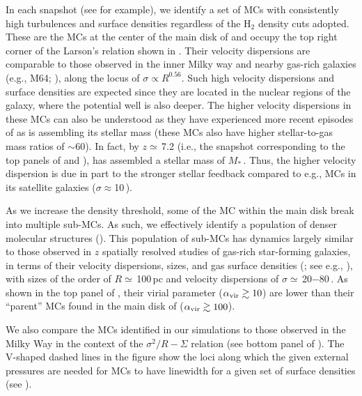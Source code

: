 \IfFileExists{emulateapjlegacy.cls}{\documentclass[iop]{emulateapjlegacy}}{\documentclass[iop]{emulateapj}}
\begin{document}
In each snapshot (see  for example),
we identify a set of MCs with consistently high turbulences and surface densities
regardless of the H$_2$ density cuts adopted.
These are the MCs at the center of the main disk of \flower and
occupy the top right corner of the Larson's relation shown in .
Their velocity dispersions are comparable to those observed in the inner Milky way and
nearby gas-rich galaxies (e.g., M64; \citealt{Oka01a, Rosolowsky05a, Heyer09a}),
along the locus of $\sigma\propto R^{0.56}$.
Such high velocity dispersions and surface densities are expected since
they are located in the nuclear regions of the
galaxy, where the potential well is also deeper. The higher velocity dispersions
in these MCs can also be understood as they have experienced more recent episodes
of \SF as \flower is assembling its stellar mass (these MCs also have higher stellar-to-gas mass ratios of $\sim$60).
In fact, by $z\simeq$\,7.2 (i.e., the snapshot corresponding
to the top panels of  and ), \flower has assembled
a stellar mass of $M_*$\,\Msun. Thus, the higher velocity dispersion
is due in part to the stronger stellar feedback compared to e.g., MCs in its satellite galaxies ($\sigma\approx$10\,\kms).

As we increase the density threshold, some of the MC within the main disk break
into multiple sub-MCs.
As such, we effectively identify a population of denser molecular structures ().
This population of sub-MCs has dynamics largely
similar to those observed
in $z$ spatially resolved studies of gas-rich star-forming galaxies, in
terms of their velocity dispersions, sizes, and gas surface densities (; see
e.g., \citealt{Swinbank11a}),
with sizes of the order of $R\simeq$\,100\,pc and velocity
dispersions of $\sigma\simeq$\,20$-$80\,\kms. 
As shown in the top panel of , their virial parameter ($\alpha_{\rm vir}\gtrsim10$)
are lower than their ``parent'' MCs found in the main disk of \flower ($\alpha_{\rm vir}\gtrsim100$). 

We also compare the MCs identified in our simulations to 
those observed in the Milky Way in the context of the $\sigma^2/R - \Sigma$ relation (see bottom panel of 
). The V-shaped dashed lines in the figure show the loci along which the given external pressures are needed for 
MCs to have linewidth for a given set of surface densities (see ). 
\end{document}

